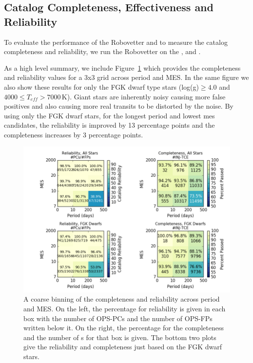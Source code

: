 \subsection{Catalog Completeness, Effectiveness and Reliability}
\label{s:candr}

To evaluate the performance of the Robovetter and to measure the catalog completeness and reliability, we run the Robovetter on the ,  and . 

As a high level summary, we include Figure~\ref{f:scoregrid} which provides the completeness and reliability values for a 3x3 grid across period and MES. In the same figure we also show these results for only the FGK dwarf type stars (log(g)$\geq4.0$ and $4000 \leq T_{eff} > 7000$\,K). Giant stars are inherently noisy causing more false positives and also causing more real transits to be distorted by the noise.  By using only the FGK dwarf stars, for the longest period and lowest mes candidates, the reliability is improved by 13 percentage points and the completeness increases by 3 percentage points.

\begin{figure}[h!]
\begin{center}
\includegraphics[width=0.95\linewidth]{fig-completeReliabilityCard.png}
\caption{ A coarse binning of the completeness and reliability across period and MES. On the left, the percentage for reliability is given in each box with the number of OPS-PCs and the number of OPS-FPs written below it.  On the right, the percentage for the completeness and the number of \injtce s for that box is given. The bottom two plots give the reliability and completeness just based on the FGK dwarf stars. }
\label{f:scoregrid}
\end{center}
\end{figure}


